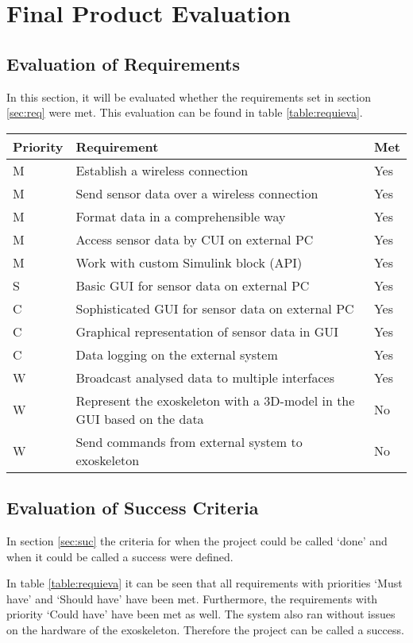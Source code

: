 \chapter{Final Product Evaluation}
\label{ch:eval}
\section{Evaluation of Requirements}
In this section, it will be evaluated whether the requirements set in section \ref{sec:req} were met. This evaluation can be found in table \ref{table:requieva}.\\

{\renewcommand{\arraystretch}{1.5}
	\centering
	\begin{tabular}{ | l | l || l || }
		\hline
		\bfseries{Priority} & \bfseries{Requirement} & \bfseries{Met} \\ \hline
		M & Establish a wireless connection & Yes \\ \hline
		M & Send sensor data over a wireless connection & Yes \\ \hline
		M & Format data in a comprehensible way & Yes \\ \hline
		M & Access sensor data by CUI on external PC & Yes \\ \hline
		M & Work with custom Simulink block (API) & Yes \\ \hline
		S & Basic GUI for sensor data on external PC & Yes \\ \hline
		C & Sophisticated GUI for sensor data on external PC & Yes \\ \hline
		C & Graphical representation of sensor data in GUI & Yes \\ \hline
		C & Data logging on the external system & Yes \\ \hline
		W & Broadcast analysed data to multiple interfaces & Yes \\ \hline
		W & Represent the exoskeleton with a 3D-model in the GUI based on the data & No \\ \hline
		W & Send commands from external system to exoskeleton & No \\ \hline 
	\end{tabular}
	\label{table:requieva}
}

\section{Evaluation of Success Criteria} \label{sec:evasuc}
In section \ref{sec:suc} the criteria for when the project could be called `done' and when it could be called a success were defined.

In table \ref{table:requieva} it can be seen that all requirements with priorities `Must have' and `Should have' have been met. Furthermore, the requirements with priority `Could have' have been met as well. The system also ran without issues on the hardware of the exoskeleton. Therefore the project can be called a success.